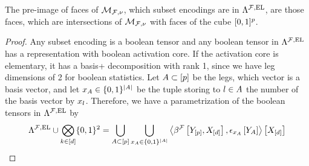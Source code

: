 \begin{theorem}\label{the:HLNExpressivity}
	The pre-image of faces of $\mathcal{M}_{\mathcal{F},\nu}$, which subset encodings are in $\Lambda^{\mathcal{F},\mathrm{EL}}$, are those faces, which are intersections of $\mathcal{M}_{\mathcal{F},\nu}$ with faces of the cube $[0,1]^p$.
\end{theorem}
\begin{proof}
	Any subset encoding is a boolean tensor and any boolean tensor in $\Lambda^{\mathcal{F},\mathrm{EL}}$ has a representation with boolean activation core. %
	If the activation core is elementary, it has a basis+ decomposition with rank 1, since we have leg dimensions of 2 for boolean statistics.
	Let $A\subset[p]$ be the legs, which vector is a basis vector, and let $x_{A}\in\{0,1\}^{\left|A\right|}$ be the tuple storing to $l\in A$ the number of the basis vector by $x_{l}$.
	Therefore, we have a parametrization of the boolean tensors in $\Lambda^{\mathcal{F},\mathrm{EL}}$ by
	\begin{align*}
		\Lambda^{\mathcal{F},\mathrm{EL}} \cup \bigotimes_{k\in[d]}\{0,1\}^{2}
		= \bigcup_{A\subset[p]} \bigcup_{x_{A}\in\{0,1\}^{\left|A\right|}}
		\left\langle \beta^{\mathcal{F}}\left[Y_{[p]},X_{[d]}\right],\epsilon_{x_{A}}\left[Y_{A}\right]\right\rangle \left[ X_{[d]} \right]
	\end{align*}


\end{proof}
